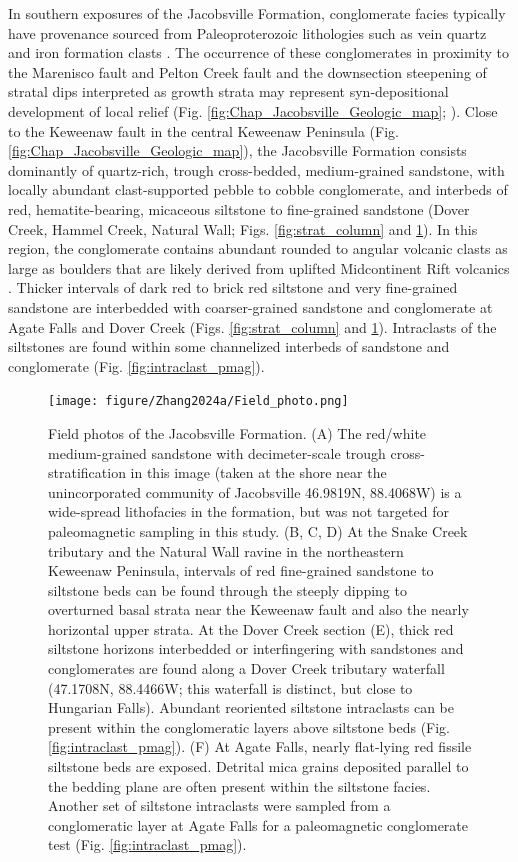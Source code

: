 In southern exposures of the Jacobsville Formation, conglomerate facies typically have provenance sourced from Paleoproterozoic lithologies such as vein quartz and iron formation clasts \citep{Hamblin1958a, Kalliokoski1982a}. The occurrence of these conglomerates in proximity to the Marenisco fault and Pelton Creek fault and the downsection steepening of stratal dips interpreted as growth strata may represent syn-depositional development of local relief (Fig. \ref{fig:Chap_Jacobsville_Geologic_map}; \cite{Kalliokoski1982a, Hedgman1992a}). Close to the Keweenaw fault in the central Keweenaw Peninsula (Fig. \ref{fig:Chap_Jacobsville_Geologic_map}), the Jacobsville Formation consists dominantly of quartz-rich, trough cross-bedded, medium-grained sandstone, with locally abundant clast-supported pebble to cobble conglomerate, and interbeds of red, hematite-bearing, micaceous siltstone to fine-grained sandstone (Dover Creek, Hammel Creek, Natural Wall; Figs. \ref{fig:strat_column} and \ref{fig:Field_photo}). In this region, the conglomerate contains abundant rounded to angular volcanic clasts as large as boulders that are likely derived from uplifted Midcontinent Rift volcanics \citep{Irving1885a, Brojanigo1984a}. Thicker intervals of dark red to brick red siltstone and very fine-grained sandstone are interbedded with coarser-grained sandstone and conglomerate at Agate Falls and Dover Creek (Figs. \ref{fig:strat_column} and \ref{fig:Field_photo}). Intraclasts of the siltstones are found within some channelized interbeds of sandstone and conglomerate (Fig. \ref{fig:intraclast_pmag}). 

\begin{figure}[h!]
\centering
\texttt{[image: figure/Zhang2024a/Field\_photo.png]}
\caption{\scriptsize Field photos of the Jacobsville Formation. (A) The red/white medium-grained sandstone with decimeter-scale trough cross-stratification in this image (taken at the shore near the unincorporated community of Jacobsville 46.9819\textdegree N, 88.4068\textdegree W) is a wide-spread lithofacies in the formation, but was not targeted for paleomagnetic sampling in this study. (B, C, D) At the Snake Creek tributary and the Natural Wall ravine in the northeastern Keweenaw Peninsula, intervals of red fine-grained sandstone to siltstone beds can be found through the steeply dipping to overturned basal strata near the Keweenaw fault and also the nearly horizontal upper strata. At the Dover Creek section (E), thick red siltstone horizons interbedded or interfingering with sandstones and conglomerates are found along a Dover Creek tributary waterfall (47.1708\textdegree N, 88.4466\textdegree W; this waterfall is distinct, but close to Hungarian Falls). Abundant reoriented siltstone intraclasts can be present within the conglomeratic layers above siltstone beds (Fig. \ref{fig:intraclast_pmag}). (F) At Agate Falls, nearly flat-lying red fissile siltstone beds are exposed. Detrital mica grains deposited parallel to the bedding plane are often present within the siltstone facies. Another set of siltstone intraclasts were sampled from a conglomeratic layer at Agate Falls for a paleomagnetic conglomerate test (Fig. \ref{fig:intraclast_pmag}).}
\label{fig:Field_photo}
\end{figure}

